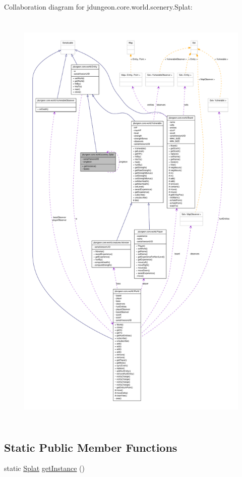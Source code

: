 Collaboration diagram for jdungeon.core.world.scenery.Splat:
\nopagebreak
\begin{figure}[H]
\begin{center}
\leavevmode
\includegraphics[height=600pt]{classjdungeon_1_1core_1_1world_1_1scenery_1_1_splat__coll__graph}
\end{center}
\end{figure}
\subsection*{Static Public Member Functions}
\begin{DoxyCompactItemize}
\item 
static \hyperlink{classjdungeon_1_1core_1_1world_1_1scenery_1_1_splat}{Splat} \hyperlink{classjdungeon_1_1core_1_1world_1_1scenery_1_1_splat_a4078f3830705a8c60a1bfd4c2b41e026}{getInstance} ()
\end{DoxyCompactItemize}


